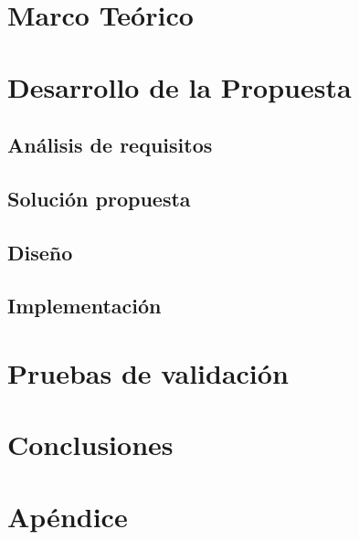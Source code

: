 \documentclass[11pt]{book}
\begin{document}
\chapter{Marco Teórico}


\chapter{Desarrollo de la Propuesta}

\section{Análisis de requisitos}


\section{Solución propuesta}


\section{Diseño}


\section{Implementación}


\chapter{Pruebas de validación}


\chapter{Conclusiones}


\printbibliography

\appendix
\chapter{Apéndice}

\end{document}
